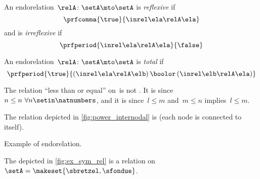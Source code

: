 \begin{ctdefinition}
    \label{def:endo_reflexive_irreflexive}
    \label{def:reflexive-relation}
    \label{def:irreflexive-relation}
    An endorelation~$\relA\colon \setA\mto \setA$ is \emph{reflexive} if
    \begin{equation}\label{eq:reflexive}
        \prfcomma{
            \true
        }{
            \inrel \ela \relA \ela
        }
    \end{equation}
    and is \emph{irreflexive} if
    \begin{equation}\label{eq:irreflexive}
        \prfperiod{
            \inrel \ela \relA \ela
        }{
            \false
        }
    \end{equation}
\end{ctdefinition}

\begin{ctdefinition}[Total]
    \label{def:total-relation}
    An endorelation~$\relA\colon \setA\mto \setA$ is \emph{total} if
    \begin{equation}\label{eq:total}
        \prfperiod{
            \true
        }{
            (\inrel\ela\relA\elb )\,\boolor\, (\inrel\elb\relA\ela)
        }
    \end{equation}
\end{ctdefinition}

\begin{example}
    The relation ``less than or equal'' on~\natnumbers is not .
    It is  since~$n\leq n \ \forall n\setin \natnumbers$, and it is  since~$l\leq m$ and~$m\leq n$ implies~$l\leq m$.
\end{example}

\begin{example}
    The relation depicted in \cref{fig:power_internodal} is  (each node is connected to itself).
\end{example}
\begin{marginfigure}
    \centering
    \caption{Example of  endorelation.}
    \label{fig:ex_sym_rel}
\end{marginfigure}
\begin{example}
    The  depicted in \cref{fig:ex_sym_rel} is a  relation on~$\setA=\makeset{\sbretzel,\sfondue}$.
\end{example}

